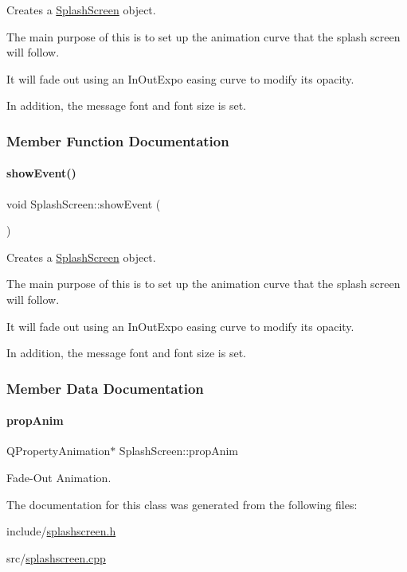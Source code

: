Creates a \mbox{\hyperlink{classSplashScreen}{Splash\+Screen}} object.

The main purpose of this is to set up the animation curve that the splash screen will follow.

It will fade out using an In\+Out\+Expo easing curve to modify its opacity.

In addition, the message font and font size is set. 

\subsubsection{Member Function Documentation}
\mbox{\label{classSplashScreen_a1fb8a268c53bc5de2ba37df68cc237cc}} 
\paragraph{\texorpdfstring{showEvent()}{showEvent()}}
{\footnotesize\ttfamily void Splash\+Screen\+::show\+Event (\begin{DoxyParamCaption}\item[{Q\+Show\+Event $\ast$}]{ }\end{DoxyParamCaption})}

Creates a \mbox{\hyperlink{classSplashScreen}{Splash\+Screen}} object.

The main purpose of this is to set up the animation curve that the splash screen will follow.

It will fade out using an In\+Out\+Expo easing curve to modify its opacity.

In addition, the message font and font size is set. 

\subsubsection{Member Data Documentation}
\mbox{\label{classSplashScreen_ad24181386e6732f6ce5d69e5ddc16cd9}} 
\paragraph{\texorpdfstring{propAnim}{propAnim}}
{\footnotesize\ttfamily Q\+Property\+Animation$\ast$ Splash\+Screen\+::prop\+Anim\hspace{0.3cm}{\ttfamily [private]}}



Fade-\/\+Out Animation. 



The documentation for this class was generated from the following files\+:\begin{DoxyCompactItemize}
\item 
include/\mbox{\hyperlink{splashscreen_8h}{splashscreen.\+h}}\item 
src/\mbox{\hyperlink{splashscreen_8cpp}{splashscreen.\+cpp}}\end{DoxyCompactItemize}
